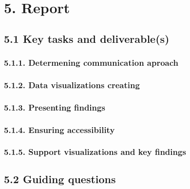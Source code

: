 \documentclass[
]{article}
\begin{document}
\newpage

\section{\texorpdfstring{\textbf{5. Report}}{5. Report}}\label{report}

\subsection{\texorpdfstring{\textbf{5.1 Key tasks and
deliverable(s)}}{5.1 Key tasks and deliverable(s)}}\label{key-tasks-and-deliverables-2}

\subsubsection{\texorpdfstring{\textbf{5.1.1. Determening communication
aproach}}{5.1.1. Determening communication aproach}}\label{determening-communication-aproach}

\subsubsection{\texorpdfstring{\textbf{5.1.2. Data visualizations
creating}}{5.1.2. Data visualizations creating}}\label{data-visualizations-creating}

\subsubsection{\texorpdfstring{\textbf{5.1.3. Presenting
findings}}{5.1.3. Presenting findings}}\label{presenting-findings}

\subsubsection{\texorpdfstring{\textbf{5.1.4. Ensuring
accessibility}}{5.1.4. Ensuring accessibility}}\label{ensuring-accessibility}

\subsubsection{\texorpdfstring{\textbf{5.1.5. Support visualizations and
key
findings}}{5.1.5. Support visualizations and key findings}}\label{support-visualizations-and-key-findings}

\subsection{\texorpdfstring{\textbf{5.2 Guiding
questions}}{5.2 Guiding questions}}\label{guiding-questions-3}
\end{document}
